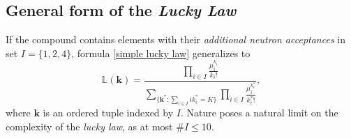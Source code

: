\subsection*{General form of the \emph{Lucky Law}}

If the compound contains elements with their {\it additional neutron acceptances} in set $I = \{ 1, 2, 4\}$, formula \eqref{simple lucky law} generalizes to 
\begin{equation*}
	\mathbb{L}( \bm{k} ) = 
	\frac{ 
		\prod_{i \in I} \frac{ \mu_i^{k_i} }{ {k_i}! } 
	}{ 
		\underset{ \{ \bm{k}^* :  \sum_{i \in I} i k_i^*  = K \} }{\sum} 	
		\prod_{i \in I} \frac{ \mu_i^{k_i^*} }{ {k_i^*}! }	
	},
\end{equation*}
where $\bm{k}$ is an ordered tuple indexed by $I$. Nature poses a natural limit on the complexity of the {\it lucky law}, as at most  $\# I \leq 10$.